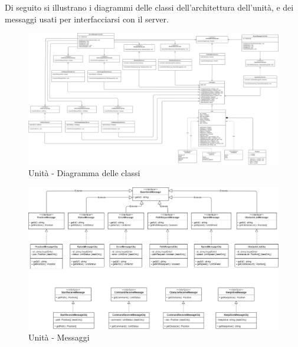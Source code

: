 Di seguito si illustrano i diagrammi delle classi dell'architettura dell'unità, e dei messaggi usati per interfacciarsi con il server.

\begin{landscape}
	\begin{figure}[h!]
		\includegraphics[width=25.5cm]{img/unit_architettura.png}
		\caption{Unità - Diagramma delle classi}
	\end{figure}
\end{landscape}

\begin{landscape}
    \begin{figure}[H]
    	\centering
    	\includegraphics[width=25.5cm]{img/unit_messaggi.png}
    	\caption{Unità - Messaggi}
    \end{figure}
\end{landscape}